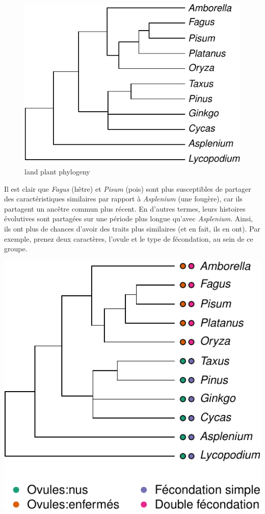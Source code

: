\documentclass[
]{book}
\begin{document}
\begin{figure}

{\centering \includegraphics{pcm-workshop_files/figure-latex/AngiospermTree-1} 

}

\caption{land plant phylogeny}\label{fig:AngiospermTree}
\end{figure}

Il est clair que \emph{Fagus} (hêtre) et \emph{Pisum} (pois) sont plus susceptibles de partager des caractéristiques similaires par rapport à \emph{Asplenium} (une fougère), car ils partagent un ancêtre commun plus récent. En d'autres termes, leurs histoires évolutives sont partagées sur une période plus longue qu'avec \emph{Asplenium}. Ainsi, ils ont plus de chances d'avoir des traits plus similaires (et en fait, ils en ont). Par exemple, prenez deux caractères, l'ovule et le type de fécondation, au sein de ce groupe.

\begin{center}\includegraphics{pcm-workshop_files/figure-latex/AngiospermsWithCharacters-1} \end{center}
\end{document}
